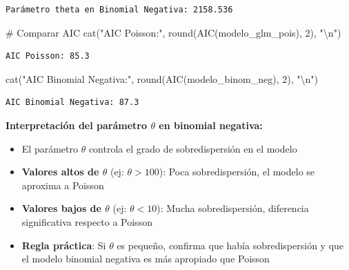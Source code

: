 \documentclass[
  letterpaper,
  DIV=11,
  numbers=noendperiod]{scrreprt}
\newenvironment{Shaded}{\begin{snugshade}}{\end{snugshade}}
\newcommand{\CommentTok}[1]{\textcolor[rgb]{0.37,0.37,0.37}{#1}}
\newcommand{\DecValTok}[1]{\textcolor[rgb]{0.68,0.00,0.00}{#1}}
\newcommand{\FunctionTok}[1]{\textcolor[rgb]{0.28,0.35,0.67}{#1}}
\newcommand{\NormalTok}[1]{\textcolor[rgb]{0.00,0.23,0.31}{#1}}
\newcommand{\SpecialCharTok}[1]{\textcolor[rgb]{0.37,0.37,0.37}{#1}}
\newcommand{\StringTok}[1]{\textcolor[rgb]{0.13,0.47,0.30}{#1}}
\providecommand{\tightlist}{%
  \setlength{\itemsep}{0pt}\setlength{\parskip}{0pt}}
\begin{document}
\begin{tcolorbox}
\begin{verbatim}
Parámetro theta en Binomial Negativa: 2158.536 
\end{verbatim}

\begin{Shaded}
\begin{Highlighting}[]
\CommentTok{\# Comparar AIC}
\FunctionTok{cat}\NormalTok{(}\StringTok{"AIC Poisson:"}\NormalTok{, }\FunctionTok{round}\NormalTok{(}\FunctionTok{AIC}\NormalTok{(modelo\_glm\_pois), }\DecValTok{2}\NormalTok{), }\StringTok{"}\SpecialCharTok{\textbackslash{}n}\StringTok{"}\NormalTok{)}
\end{Highlighting}
\end{Shaded}

\begin{verbatim}
AIC Poisson: 85.3 
\end{verbatim}

\begin{Shaded}
\begin{Highlighting}[]
\FunctionTok{cat}\NormalTok{(}\StringTok{"AIC Binomial Negativa:"}\NormalTok{, }\FunctionTok{round}\NormalTok{(}\FunctionTok{AIC}\NormalTok{(modelo\_binom\_neg), }\DecValTok{2}\NormalTok{), }\StringTok{"}\SpecialCharTok{\textbackslash{}n}\StringTok{"}\NormalTok{)}
\end{Highlighting}
\end{Shaded}

\begin{verbatim}
AIC Binomial Negativa: 87.3 
\end{verbatim}

\end{tcolorbox}

\textbf{Interpretación del parámetro \(\theta\) en binomial negativa:}

\begin{itemize}
\tightlist
\item
  El parámetro \(\theta\) controla el grado de sobredispersión en el
  modelo
\item
  \textbf{Valores altos de \(\theta\)} (ej: \(\theta > 100\)): Poca
  sobredispersión, el modelo se aproxima a Poisson
\item
  \textbf{Valores bajos de \(\theta\)} (ej: \(\theta < 10\)): Mucha
  sobredispersión, diferencia significativa respecto a Poisson
\item
  \textbf{Regla práctica}: Si \(\theta\) es pequeño, confirma que había
  sobredispersión y que el modelo binomial negativa es más apropiado que
  Poisson
\end{itemize}
\end{document}
